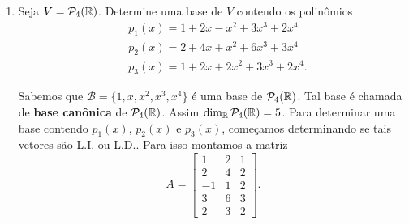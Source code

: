 \begin{exemplo}
\begin{enumerate}
\begin{solucao}
\[\begin{pmatrix}
				\overline{0}\\
				\overline{0}\\
				\overline{1}\\
				\overline{0}
			\end{pmatrix}, e_5 = \begin{pmatrix}
				\overline{0}\\
				\overline{0}\\
				\overline{0}\\
				\overline{0}\\
				\overline{1}
			\end{pmatrix}\right\},
		\]
		da{\'\i} $\dim_{\integer_7}\cp{M}_{5\times1}(\integer_7) = 5$. Assim como $S$ possui 5 elementos, basta mostrar que $S$ \'e L.I.. O que \'e imediato pois
		\[
			a_1e_1 + a_2e_2 + a_3e_3 + a_4e_4 + a_5e_5 = \begin{pmatrix}
				\overline{0}\\
				\overline{0}\\
				\overline{0}\\
				\overline{0}\\
				\overline{0}
			\end{pmatrix}
		\]
		s\'o \'e poss{\'\i}vel se $a_1 = a_2 = a_3 = a_4 = a_5 = \overline{0}$.
		\end{solucao}
		\item Seja $V = \mathcal{P}_4(\mathbb{R})$. Determine uma base de $V$ contendo os polin\^omios
		\begin{align*}
			&p_1(x) = 1 + 2x - x^2 + 3x^3 + 2x^4\\
			&p_2(x) = 2 + 4x + x^2 + 6x^3 + 3x^4\\
			&p_3(x) = 1 + 2x + 2x^2 + 3x^3 + 2x^4.
		\end{align*}
		\begin{solucao}
			Sabemos que $\mathcal{B} = \{1,x,x^2,x^3,x^4\}$ \'e uma base de $\mathcal{P}_4(\mathbb{R})$. Tal base \'e chamada de \textbf{base can\^onica} de $\mathcal{P}_4(\mathbb{R})$. Assim $\dim_{\mathbb{R}} \mathcal{P}_4(\mathbb{R}) = 5$. Para determinar uma base contendo $p_1(x)$, $p_2(x)$ e $p_3(x)$, come\c{c}amos determinando se tais vetores s\~ao L.I. ou L.D.. Para isso montamos a matriz
			\[
				A = \begin{bmatrix}
					1 & 2 & 1\\
					2 & 4 & 2\\
					-1 & 1 & 2\\
					3 & 6 & 3\\
					2 & 3 & 2
				\end{bmatrix}.
			\]

\end{solucao}
\end{enumerate}
\end{exemplo}
